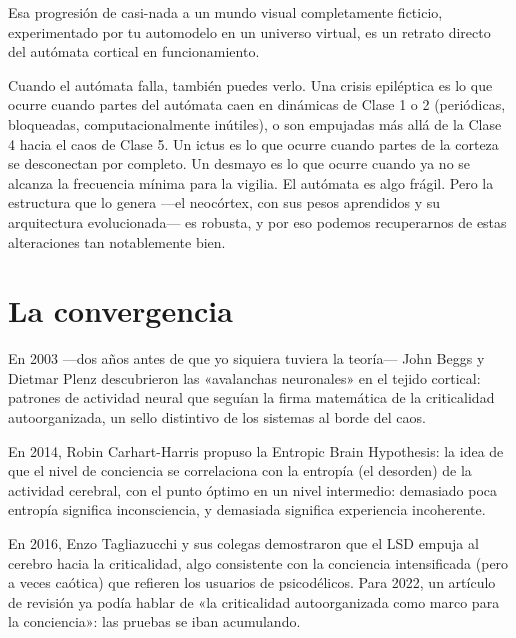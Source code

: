\documentclass[11pt, twoside, openright]{book}
\begin{document}
Esa progresión de casi-nada a un mundo visual completamente ficticio, experimentado por tu automodelo en un universo virtual, es un retrato directo del autómata cortical en funcionamiento.

Cuando el autómata falla, también puedes verlo. Una crisis epiléptica es lo que ocurre cuando partes del autómata caen en dinámicas de Clase 1 o 2 (periódicas, bloqueadas, computacionalmente inútiles), o son empujadas más allá de la Clase 4 hacia el caos de Clase 5. Un ictus es lo que ocurre cuando partes de la corteza se desconectan por completo. Un desmayo es lo que ocurre cuando ya no se alcanza la frecuencia mínima para la vigilia. El autómata es algo frágil. Pero la estructura que lo genera ---el neocórtex, con sus pesos aprendidos y su arquitectura evolucionada--- es robusta, y por eso podemos recuperarnos de estas alteraciones tan notablemente bien.

\section*{La convergencia}

En 2003 ---dos años antes de que yo siquiera tuviera la teoría--- John Beggs y Dietmar Plenz descubrieron las «avalanchas neuronales» en el tejido cortical: patrones de actividad neural que seguían la firma matemática de la criticalidad autoorganizada, un sello distintivo de los sistemas al borde del caos.

En 2014, Robin Carhart-Harris propuso la Entropic Brain Hypothesis: la idea de que el nivel de conciencia se correlaciona con la entropía (el desorden) de la actividad cerebral, con el punto óptimo en un nivel intermedio: demasiado poca entropía significa inconsciencia, y demasiada significa experiencia incoherente.

En 2016, Enzo Tagliazucchi y sus colegas demostraron que el LSD empuja al cerebro hacia la criticalidad, algo consistente con la conciencia intensificada (pero a veces caótica) que refieren los usuarios de psicodélicos. Para 2022, un artículo de revisión ya podía hablar de «la criticalidad autoorganizada como marco para la conciencia»: las pruebas se iban acumulando.
\end{document}
